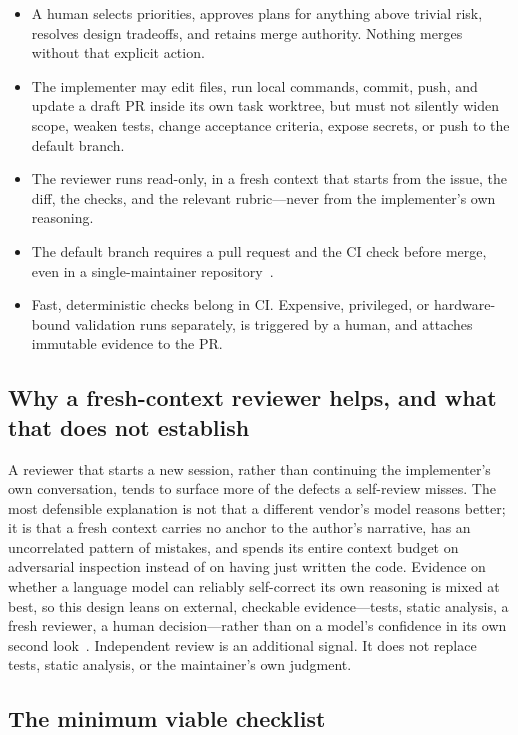 \documentclass[11pt]{article}
\begin{document}
\begin{itemize}
  \item A human selects priorities, approves plans for anything above trivial risk, resolves
    design tradeoffs, and retains merge authority. Nothing merges without that explicit action.
  \item The implementer may edit files, run local commands, commit, push, and update a draft PR
    inside its own task worktree, but must not silently widen scope, weaken tests, change
    acceptance criteria, expose secrets, or push to the default branch.
  \item The reviewer runs read-only, in a fresh context that starts from the issue, the diff, the
    checks, and the relevant rubric---never from the implementer's own reasoning.
  \item The default branch requires a pull request and the CI check before merge, even in a
    single-maintainer repository~\cite{github2026branchprotect,github2026rulesets}.
  \item Fast, deterministic checks belong in CI. Expensive, privileged, or hardware-bound
    validation runs separately, is triggered by a human, and attaches immutable evidence to the PR.
\end{itemize}

\subsection{Why a fresh-context reviewer helps, and what that does not establish}

A reviewer that starts a new session, rather than continuing the implementer's own conversation,
tends to surface more of the defects a self-review misses. The most defensible explanation is not
that a different vendor's model reasons better; it is that a fresh context carries no anchor to
the author's narrative, has an uncorrelated pattern of mistakes, and spends its entire context
budget on adversarial inspection instead of on having just written the code. Evidence on whether a
language model can reliably self-correct its own reasoning is mixed at best, so this design leans
on external, checkable evidence---tests, static analysis, a fresh reviewer, a human
decision---rather than on a model's confidence in its own second
look~\cite{huang2024selfcorrect,olausson2024selfrepair,kamoi2024critical}. Independent review is
an additional signal. It does not replace tests, static analysis, or the maintainer's own
judgment.

\subsection{The minimum viable checklist}
\end{document}
